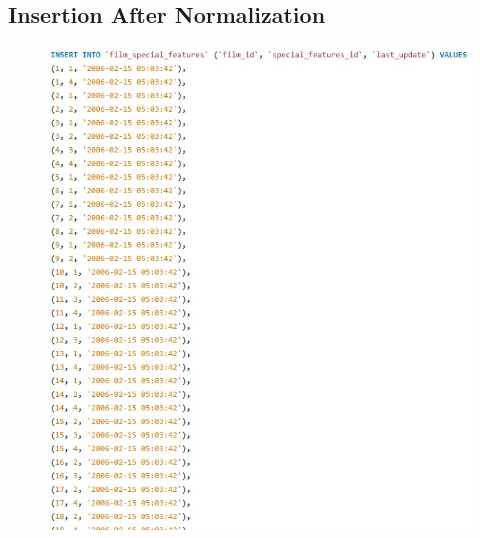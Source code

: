 \documentclass{article}
\begin{document}
	\subsection{Insertion After Normalization}
		\begin{figure}[H]
			\includegraphics[width=\textwidth]{filmspecialfeatures1_insert_norm}

\end{figure}
\end{document}

